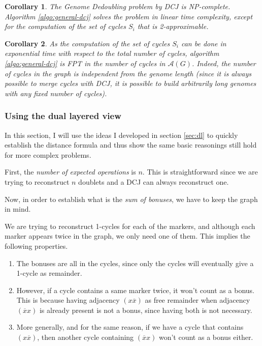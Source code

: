 \documentclass[11pt,final,twoside,nofrench]{thlifl}
\newcommand{\snd}[1]{ \ensuremath{\overline{#1}} }
\newtheorem{corollary}{Corollary}
\begin{document}
\begin{corollary}
\label{lem:hardness-dcj}
The Genome Dedoubling problem by DCJ is NP-complete. Algorithm 
\ref{algo:general-dcj} solves the problem 
in linear time complexity, except for the computation of the set 
of cycles $S_i$ that is 2-approximable.
\end{corollary}

\begin{corollary}
As the computation of the set 
of cycles $S_i$ can be done in exponential time with respect to the total number of cycles, algorithm 
\ref{algo:general-dcj} is FPT in the number of cycles in $\mathcal{A}(G)$. Indeed, the number of cycles in the graph is independent from the genome length (since it is always possible to merge cycles with DCJ, it is possible to build arbitrarily long genomes with any fixed number of cycles).
\end{corollary}

\subsubsection{Using the dual layered view}
\label{sec:dedoublebonus}

In this section, I will use the ideas I developed in section \ref{sec:dl} to quickly establish the distance formula and thus show the same basic reasonings still hold for more complex problems.

First, the \emph{number of expected operations} is $n$. This is straightforward since we are trying to reconstruct $n$ doublets and a DCJ can always reconstruct one.

Now, in order to establish what is the \emph{sum of bonuses}, we have to keep the graph in mind.

We are trying to reconstruct 1-cycles for each of the markers, and although each marker appears twice in the graph, we only need one of them. This implies the following properties.

\begin{enumerate}
\item{The bonuses are all in the cycles, since only the cycles will eventually give a 1-cycle as remainder.}

\item{However, if a cycle contains a same marker twice, it won't count as a bonus. This is because having adjacency $(x \snd{x})$ as free remainder when adjacency $(\snd{x} x)$ is already present is not a bonus, since having both is not necessary.}

\item{More generally, and for the same reason, if we have a cycle that contains $(x \snd{x})$, then another cycle containing $(\snd{x} x)$ won't count as a bonus either.}
\end{enumerate}
\end{document}
